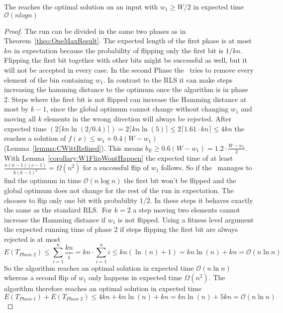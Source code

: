 \begin{lemma}
      The \RLSR[k=2] reaches the optimal solution on an input with $w_1\ge W/2$ in expected time $\mathcal{O}(nlogn)$
\end{lemma}
\begin{proof}
      The run can be divided in the same two phases as in Theorem~\ref{theo:OneMaxResult}.
      The expected length of the first phase is at most $kn$ in expectation because the probability of flipping only the first bit is $1/kn$.
      Flipping the first bit together with other bits might be successful as well, but it will not be accepted in every case.\newline
      In the second Phase the \RLSR~tries to remove every element of the bin containing $w_1$.
      In contrast to the RLS it can make steps increasing the hamming distance to the optimum once the algorithm is in phase 2.
      Steps where the first bit is not flipped can increase the Hamming distance at most by $k-1$, since the global optimum cannot change without changing $w_1$ and moving all $k$ elements in the wrong direction will always be rejected.
      After expected time $(2\lceil kn\ln(2/0.4)\rceil)=2\lceil kn\ln(5)\rceil\le2\lceil 1.61\cdot kn\rceil\le4kn$ the \RLSR[k] reaches a solution of \(f(x)\le w_1+0.4(W-w_1)\) (Lemma~\ref{lemma:CWittRefined}).
      This means \(b_E \ge 0.6(W-w_1) = 1.2\cdot\frac{W-w_1}{2}\).
      With Lemma~\ref{corollary:W1FlipWontHappen} the expected time of at least \(\frac{n(n-1)(c-1)}{k{(k-1)}^2}=\Omega(n^2)\) for a successful flip of $w_1$ follows.
      So if the \RLSR~manages to find the optimum in time $\mathcal{O}(n\log{}n)$ the first bit won't be flipped and the global optimum does not change for the rest of the run in expectation.\newline
      The \RLSR[2] chooses to flip only one bit with probability $1/2$.
      In these steps it behaves exactly the same as the standard RLS.\
      For $k=2$ a step moving two elements cannot increase the Hamming distance if $w_1$ is not flipped.
      Using a fitness level argument the expected running time of phase 2 if steps flipping the first bit are always rejected is at most
      \[
            E(T_{Phase~2})
            \le \sum_{i=1}^{n}{\frac{kn}{i}}
            = kn\cdot\sum_{i=1}^{n}{i}
            \le kn(\ln(n)+1)
            = kn\ln(n)+kn
            = \mathcal{O}(n\ln n)
      \]
      So the algorithm reaches an optimal solution in expected time $\mathcal{O}(n\ln n)$ whereas a second flip of $w_1$ only happens in expected time $\Omega(n^2)$.
      The algorithm therefore reaches an optimal solution in expected time
      \[E(T_{Phase~1}) + E(T_{Phase~2})
            \le 4kn + kn\ln(n)+kn
            = kn\ln(n)+5kn
            = \mathcal{O}(n\ln n)\]
\end{proof}

